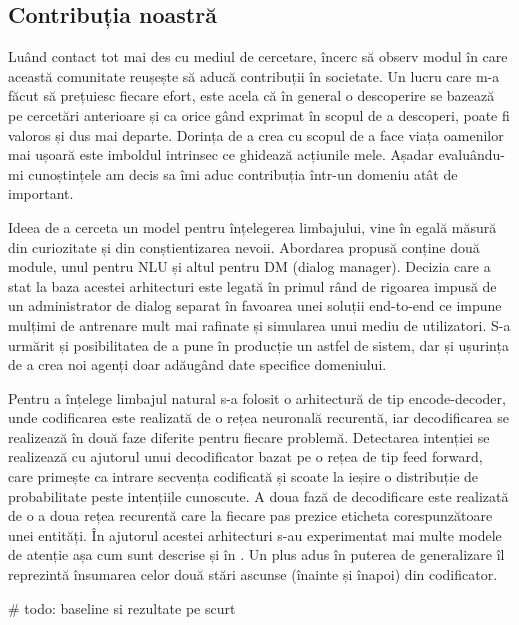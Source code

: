 \subsection{Contribuția noastră}

Luând contact tot mai des cu mediul de cercetare, încerc să observ modul în care această comunitate reușește să aducă contribuții în societate. Un lucru care m-a făcut să prețuiesc fiecare efort, este acela că în general o descoperire se bazează pe cercetări anterioare și ca orice gând exprimat în scopul de a descoperi, poate fi valoros și dus mai departe. Dorința de a crea cu scopul de a face viața oamenilor mai ușoară este imboldul intrinsec ce ghidează acțiunile mele. Așadar evaluându-mi cunoștințele am decis sa îmi aduc contribuția într-un domeniu atât de important.

Ideea de a cerceta un model pentru înțelegerea limbajului, vine în egală măsură din curiozitate și din conștientizarea nevoii. Abordarea propusă conține două module, unul pentru NLU și altul pentru DM (dialog manager). Decizia care a stat la baza acestei arhitecturi este legată în primul rând de rigoarea impusă de un administrator de dialog separat în favoarea unei soluții end-to-end ce impune mulțimi de antrenare mult mai rafinate și simularea unui mediu de utilizatori. S-a urmărit și posibilitatea de a pune în producție un astfel de sistem, dar și ușurința de a crea noi agenți doar adăugând date specifice domeniului.


Pentru a înțelege limbajul natural s-a folosit o arhitectură de tip encode-decoder, unde codificarea este realizată de o rețea neuronală recurentă, iar decodificarea se realizează în două faze diferite pentru fiecare problemă. Detectarea intenției se realizează cu ajutorul unui decodificator bazat pe o rețea de tip feed forward, care primește ca intrare secvența codificată și scoate la ieșire o distribuție de probabilitate peste intențiile cunoscute. A doua fază de decodificare este realizată de o a doua rețea recurentă care la fiecare pas prezice eticheta corespunzătoare unei entități. În ajutorul acestei arhitecturi s-au experimentat mai multe modele de atenție așa cum sunt descrise și în \cite{trans_luong_manning}. Un plus adus în puterea de generalizare îl reprezintă însumarea celor două stări ascunse (înainte și înapoi) din codificator.

\# todo: baseline si rezultate pe scurt


